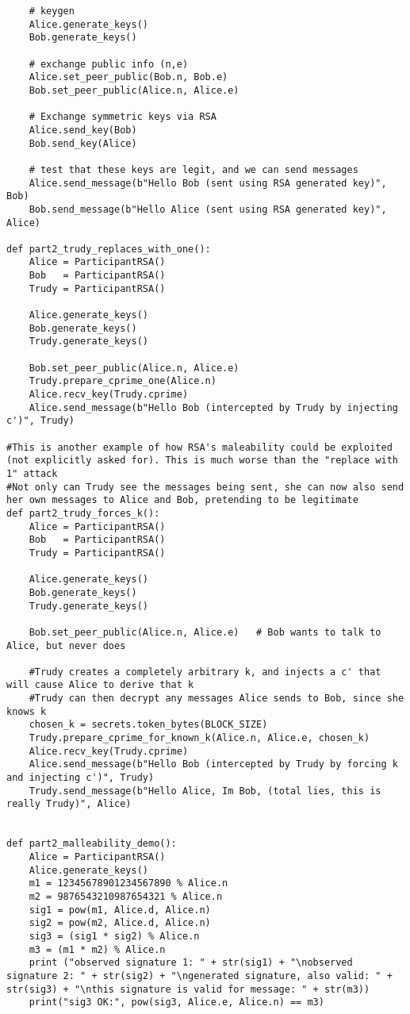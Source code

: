 \documentclass[11pt]{article}
\begin{document}
\begin{lstlisting}
    # keygen
    Alice.generate_keys()
    Bob.generate_keys()

    # exchange public info (n,e)
    Alice.set_peer_public(Bob.n, Bob.e)
    Bob.set_peer_public(Alice.n, Alice.e)

    # Exchange symmetric keys via RSA
    Alice.send_key(Bob)   
    Bob.send_key(Alice)   

    # test that these keys are legit, and we can send messages
    Alice.send_message(b"Hello Bob (sent using RSA generated key)", Bob)
    Bob.send_message(b"Hello Alice (sent using RSA generated key)", Alice)

def part2_trudy_replaces_with_one():
    Alice = ParticipantRSA()
    Bob   = ParticipantRSA()
    Trudy = ParticipantRSA()

    Alice.generate_keys()
    Bob.generate_keys()
    Trudy.generate_keys()

    Bob.set_peer_public(Alice.n, Alice.e)
    Trudy.prepare_cprime_one(Alice.n)
    Alice.recv_key(Trudy.cprime)
    Alice.send_message(b"Hello Bob (intercepted by Trudy by injecting c')", Trudy)

#This is another example of how RSA's maleability could be exploited (not explicitly asked for). This is much worse than the "replace with 1" attack
#Not only can Trudy see the messages being sent, she can now also send her own messages to Alice and Bob, pretending to be legitimate
def part2_trudy_forces_k():
    Alice = ParticipantRSA()
    Bob   = ParticipantRSA()
    Trudy = ParticipantRSA()

    Alice.generate_keys()
    Bob.generate_keys()
    Trudy.generate_keys()

    Bob.set_peer_public(Alice.n, Alice.e)   # Bob wants to talk to Alice, but never does

    #Trudy creates a completely arbitrary k, and injects a c' that will cause Alice to derive that k
    #Trudy can then decrypt any messages Alice sends to Bob, since she knows k
    chosen_k = secrets.token_bytes(BLOCK_SIZE)
    Trudy.prepare_cprime_for_known_k(Alice.n, Alice.e, chosen_k)
    Alice.recv_key(Trudy.cprime)
    Alice.send_message(b"Hello Bob (intercepted by Trudy by forcing k and injecting c')", Trudy)
    Trudy.send_message(b"Hello Alice, Im Bob, (total lies, this is really Trudy)", Alice)


def part2_malleability_demo():
    Alice = ParticipantRSA()
    Alice.generate_keys()
    m1 = 12345678901234567890 % Alice.n
    m2 = 9876543210987654321 % Alice.n
    sig1 = pow(m1, Alice.d, Alice.n)
    sig2 = pow(m2, Alice.d, Alice.n)
    sig3 = (sig1 * sig2) % Alice.n
    m3 = (m1 * m2) % Alice.n
    print ("observed signature 1: " + str(sig1) + "\nobserved signature 2: " + str(sig2) + "\ngenerated signature, also valid: " + str(sig3) + "\nthis signature is valid for message: " + str(m3))
    print("sig3 OK:", pow(sig3, Alice.e, Alice.n) == m3)


\end{lstlisting}
\end{document}
